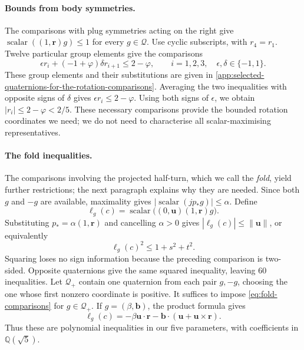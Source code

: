 \paragraph{Bounds from body symmetries.}
The comparisons with plug symmetries acting on the right give
$\operatorname{scalar}((1,\mathbf r)g)\le1$ for every $g\in\mathcal Q$.
Use cyclic subscripts, with $r_4=r_1$.
Twelve particular group elements give the comparisons
\begin{equation}\label{eq:rotation-comparisons}
  \epsilon r_i+(-1+\varphi)\delta r_{i+1}\le2-\varphi,
  \qquad i=1,2,3,\quad \epsilon,\delta\in\{-1,1\}.
\end{equation}
These group elements and their substitutions are given in
\cref{app:selected-quaternions-for-the-rotation-comparisons}.
Averaging the two inequalities with opposite signs of $\delta$ gives
$\epsilon r_i\le2-\varphi$. Using both signs of $\epsilon$, we obtain
$|r_i|\le2-\varphi<2/5$. These necessary comparisons provide the
bounded rotation coordinates we need; we do not need to characterise
all scalar-maximising representatives.

\paragraph{The fold inequalities.}
The comparisons involving the projected half-turn, which we call the
\emph{fold}, yield further restrictions; the next paragraph explains why
they are needed. Since both $g$ and $-g$ are available, maximality gives
$|\operatorname{scalar}(j p_*g)|\le\alpha$. Define
\begin{equation}\label{eq:fold-polynomial}
  \ell_g(c)=\operatorname{scalar}\bigl((0,\mathbf u)(1,\mathbf r)g\bigr).
\end{equation}
Substituting $p_*=\alpha(1,\mathbf r)$ and cancelling $\alpha>0$ gives
$|\ell_g(c)|\le\lVert\mathbf u\rVert$, or equivalently
\begin{equation}\label{eq:fold-comparisons}
  {\ell_g(c)}^2\le1+s^2+t^2.
\end{equation}
Squaring loses no sign information because the preceding comparison is
two-sided. Opposite quaternions give the same squared inequality, leaving
60 inequalities. Let $\mathcal Q_+$ contain one quaternion from each pair
$g,-g$, choosing the one whose first nonzero coordinate is positive.
It suffices to impose \cref{eq:fold-comparisons} for $g\in\mathcal Q_+$.
If $g=(\beta,\mathbf b)$, the product formula gives
\[
  \ell_g(c)=-\beta\mathbf u\cdot\mathbf r
           -\mathbf b\cdot(\mathbf u+\mathbf u\times\mathbf r).
\]
Thus these are polynomial inequalities in our five parameters, with
coefficients in $\mathbb Q(\sqrt5)$.

